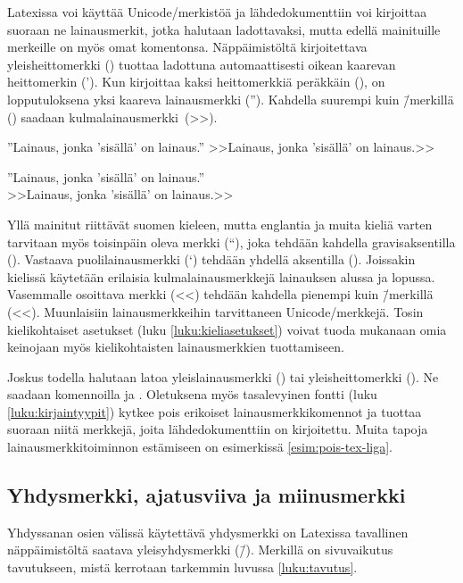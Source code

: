 Latexissa voi käyttää Unicode\-/merkistöä ja lähdedokumenttiin voi
kirjoittaa suoraan ne lainausmerkit, jotka halutaan ladottavaksi, mutta
edellä mainituille merkeille on myös omat komentonsa. Näppäimistöltä
kirjoitettava yleisheittomerkki () tuottaa ladottuna
automaattisesti oikean kaarevan heittomerkin ('). Kun kirjoittaa kaksi
heittomerkkiä peräkkäin (), on lopputuloksena yksi kaareva
lainausmerkki (''). Kahdella suurempi kuin \=/merkillä (\koodi{>>})
saadaan kulmalainausmerkki~(>>).

\begin{koodilohkosis}
  ''Lainaus, jonka 'sisällä' on lainaus.''
  >>Lainaus, jonka 'sisällä' on lainaus.>>
\end{koodilohkosis}

\begin{tulossis}
  ''Lainaus, jonka 'sisällä' on lainaus.'' \\
  >>Lainaus, jonka 'sisällä' on lainaus.>>
\end{tulossis}

Yllä mainitut riittävät suomen kieleen, mutta englantia ja muita kieliä
varten tarvitaan myös toisinpäin oleva merkki (``), joka tehdään
kahdella gra\-vis\-ak\-sen\-til\-la (). Vastaava
puolilainausmerkki (`) tehdään yhdellä aksentilla (). Joissakin
kielissä käytetään erilaisia kulmalainausmerkkejä lainauksen alussa ja
lopussa. Vasemmalle osoittava merkki (<<) tehdään kahdella pienempi kuin
\=/merkillä (<\mbox{}<). Muunlaisiin lainausmerkkeihin tarvittaneen
Unicode\-/merkkejä. Tosin kielikohtaiset asetukset (luku
\ref{luku:kieliasetukset}) voivat tuoda mukanaan omia keinojaan myös
kielikohtaisten lainausmerkkien tuottamiseen.

Joskus todella halutaan latoa yleislainausmerkki (\textquotedbl) tai
yleisheittomerkki (\textquotesingle). Ne saadaan komennoilla
 ja . Oletuksena
myös tasalevyinen fontti (luku \ref{luku:kirjaintyypit}) kytkee pois
erikoiset lainausmerkkikomennot ja tuottaa suoraan niitä merkkejä, joita
lähdedokumenttiin on kirjoitettu. Muita tapoja lainausmerkkitoiminnon
estämiseen on esimerkissä \ref{esim:pois-tex-liga}.

\subsection{Yhdysmerkki, ajatusviiva ja miinusmerkki}

Yhdyssanan osien välissä käytettävä yhdysmerkki on Latexissa tavallinen
näppäimistöltä saatava yleis\-yh\-dys\-merk\-ki (\=/). Merkillä on
sivuvaikutus tavutukseen, mistä kerrotaan tarkemmin luvussa
\ref{luku:tavutus}.

